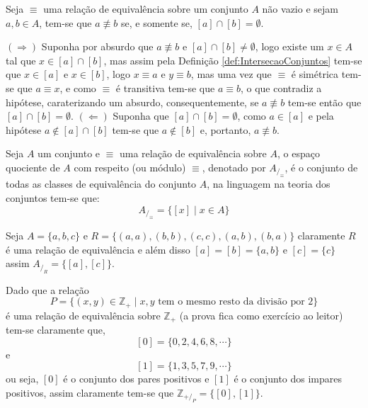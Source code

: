 \begin{teorema}\label{teo:EquivalenciaPropriedade2}
	Seja $\equiv$ uma relação de equivalência sobre um conjunto $A$ não vazio e sejam $a, b \in A$, tem-se que $a \not\equiv b$ se, e somente se, $[a] \cap [b] = \emptyset$.
\end{teorema}

\begin{prova}
	$(\Rightarrow)$ Suponha por absurdo que $a \not\equiv b$ e $[a] \cap [b] \neq \emptyset$, logo existe um $x \in A$ tal que $x \in [a] \cap [b]$, mas assim pela Definição \ref{def:IntersecaoConjuntos} tem-se que $x \in [a]$ e $x \in [b]$, logo $x \equiv a$ e $y \equiv b$, mas uma vez que $\equiv$ é simétrica tem-se que $a \equiv x$, e como $\equiv$ é transitiva tem-se que $a \equiv b$, o que contradiz a hipótese, caraterizando um absurdo, consequentemente, se $a \not\equiv b$ tem-se então que $[a] \cap [b] = \emptyset$. $(\Leftarrow)$ Suponha que $[a] \cap [b] = \emptyset$, como $a \in [a]$ e pela hipótese $a \notin [a] \cap [b]$ tem-se que $a \notin [b]$ e, portanto, $a \not\equiv b$.
\end{prova}


\begin{definicao}\label{def:EspacoQuociente}
	Seja $A$ um conjunto e $\equiv$ uma relação de equivalência sobre $A$, o espaço quociente de $A$ com respeito (ou módulo) $\equiv$, denotado por $A_{/_\equiv}$, é o conjunto de todas as classes de equivalência do conjunto $A$, na linguagem na teoria dos conjuntos tem-se que:
	$$A_{/_\equiv} = \{[x] \mid x \in A\}$$
\end{definicao}

\begin{exemplo}
	Seja $A = \{a, b, c\}$ e $R = \{(a, a), (b, b), (c, c), (a, b), (b, a)\}$ claramente $R$ é uma relação de equivalência e além disso $[a] = [b] = \{a, b\}$ e $[c] = \{c\}$ assim $A_{/_R} = \{[a], [c]\}$.
\end{exemplo}

\begin{exemplo}
	Dado que a relação 
  $$P = \{(x,y) \in \mathbb{Z}_+ \mid x, y\text{ tem o mesmo resto da divisão por } 2\}$$ 
  é uma relação de equivalência sobre $\mathbb{Z}_+$ (a prova fica como exercício ao leitor) tem-se claramente que, 
	$$[0] = \{0, 2, 4, 6, 8, \cdots\}$$
	e
	$$[1] = \{1, 3, 5, 7, 9, \cdots\}$$
	ou seja, $[0]$ é o conjunto dos pares positivos e $[1]$ é o conjunto dos impares positivos, assim claramente tem-se que $\mathbb{Z}_{+/_P} = \{[0], [1]\}$.
\end{exemplo}

